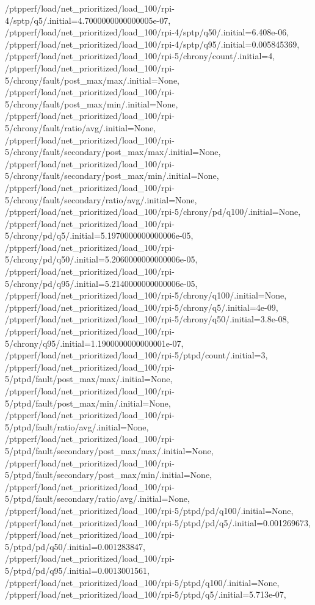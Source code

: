 {    /ptpperf/load/net_prioritized/load_100/rpi-4/sptp/q5/.initial=4.7000000000000005e-07,
    /ptpperf/load/net_prioritized/load_100/rpi-4/sptp/q50/.initial=6.408e-06,
    /ptpperf/load/net_prioritized/load_100/rpi-4/sptp/q95/.initial=0.005845369,
    /ptpperf/load/net_prioritized/load_100/rpi-5/chrony/count/.initial=4,
    /ptpperf/load/net_prioritized/load_100/rpi-5/chrony/fault/post_max/max/.initial=None,
    /ptpperf/load/net_prioritized/load_100/rpi-5/chrony/fault/post_max/min/.initial=None,
    /ptpperf/load/net_prioritized/load_100/rpi-5/chrony/fault/ratio/avg/.initial=None,
    /ptpperf/load/net_prioritized/load_100/rpi-5/chrony/fault/secondary/post_max/max/.initial=None,
    /ptpperf/load/net_prioritized/load_100/rpi-5/chrony/fault/secondary/post_max/min/.initial=None,
    /ptpperf/load/net_prioritized/load_100/rpi-5/chrony/fault/secondary/ratio/avg/.initial=None,
    /ptpperf/load/net_prioritized/load_100/rpi-5/chrony/pd/q100/.initial=None,
    /ptpperf/load/net_prioritized/load_100/rpi-5/chrony/pd/q5/.initial=5.1970000000000006e-05,
    /ptpperf/load/net_prioritized/load_100/rpi-5/chrony/pd/q50/.initial=5.2060000000000006e-05,
    /ptpperf/load/net_prioritized/load_100/rpi-5/chrony/pd/q95/.initial=5.2140000000000006e-05,
    /ptpperf/load/net_prioritized/load_100/rpi-5/chrony/q100/.initial=None,
    /ptpperf/load/net_prioritized/load_100/rpi-5/chrony/q5/.initial=4e-09,
    /ptpperf/load/net_prioritized/load_100/rpi-5/chrony/q50/.initial=3.8e-08,
    /ptpperf/load/net_prioritized/load_100/rpi-5/chrony/q95/.initial=1.1900000000000001e-07,
    /ptpperf/load/net_prioritized/load_100/rpi-5/ptpd/count/.initial=3,
    /ptpperf/load/net_prioritized/load_100/rpi-5/ptpd/fault/post_max/max/.initial=None,
    /ptpperf/load/net_prioritized/load_100/rpi-5/ptpd/fault/post_max/min/.initial=None,
    /ptpperf/load/net_prioritized/load_100/rpi-5/ptpd/fault/ratio/avg/.initial=None,
    /ptpperf/load/net_prioritized/load_100/rpi-5/ptpd/fault/secondary/post_max/max/.initial=None,
    /ptpperf/load/net_prioritized/load_100/rpi-5/ptpd/fault/secondary/post_max/min/.initial=None,
    /ptpperf/load/net_prioritized/load_100/rpi-5/ptpd/fault/secondary/ratio/avg/.initial=None,
    /ptpperf/load/net_prioritized/load_100/rpi-5/ptpd/pd/q100/.initial=None,
    /ptpperf/load/net_prioritized/load_100/rpi-5/ptpd/pd/q5/.initial=0.001269673,
    /ptpperf/load/net_prioritized/load_100/rpi-5/ptpd/pd/q50/.initial=0.001283847,
    /ptpperf/load/net_prioritized/load_100/rpi-5/ptpd/pd/q95/.initial=0.0013001561,
    /ptpperf/load/net_prioritized/load_100/rpi-5/ptpd/q100/.initial=None,
    /ptpperf/load/net_prioritized/load_100/rpi-5/ptpd/q5/.initial=5.713e-07,
}
